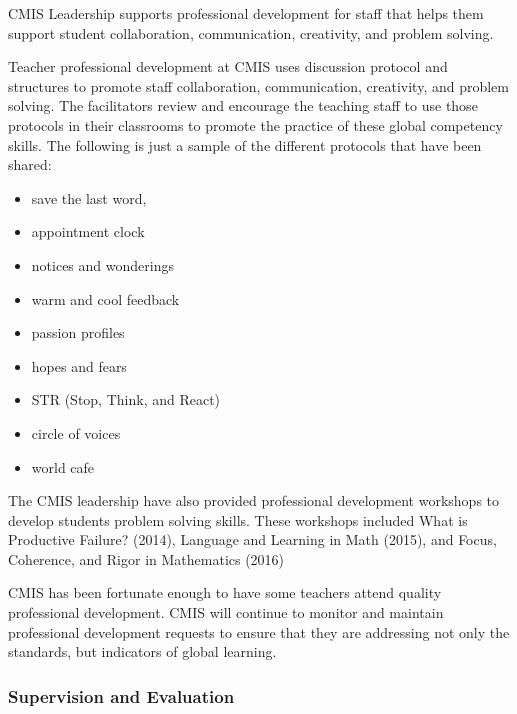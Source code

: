 \begin{findings}
CMIS Leadership supports professional development for staff that helps them support student collaboration, communication, creativity, and problem solving.

Teacher professional development at CMIS uses discussion protocol and structures to promote staff collaboration, communication, creativity, and problem solving. The facilitators review and encourage the teaching staff to use those protocols in their classrooms to promote the practice of these global competency skills. The following is just a sample of the different protocols that have been shared:

\begin{itemize}
\item save the last word,
\item appointment clock 
\item notices and wonderings
\item warm and cool feedback
\item passion profiles
\item hopes and fears
\item STR (Stop, Think, and React)
\item circle of voices
\item world cafe
\end{itemize}

The CMIS leadership have also provided professional development workshops to develop students problem solving skills. These workshops included What is Productive Failure? (2014), Language and Learning in Math (2015), and Focus, Coherence, and Rigor in Mathematics (2016)


CMIS has been fortunate enough to have some teachers attend quality professional development.  CMIS will continue to monitor and maintain professional development requests to ensure that they are addressing not only the standards, but indicators of global learning.
\end{findings}

\subsubsection{Supervision and Evaluation}


